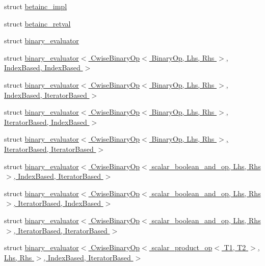 \begin{DoxyCompactItemize}
struct \hyperlink{struct_eigen_1_1internal_1_1betainc__impl}{betainc\+\_\+impl}
\item 
struct \hyperlink{struct_eigen_1_1internal_1_1betainc__retval}{betainc\+\_\+retval}
\item 
struct \hyperlink{struct_eigen_1_1internal_1_1binary__evaluator}{binary\+\_\+evaluator}
\item 
struct \hyperlink{struct_eigen_1_1internal_1_1binary__evaluator_3_01_cwise_binary_op_3_01_binary_op_00_01_lhs_00_009c1543c08828196fc8ade7d79a56c66}{binary\+\_\+evaluator$<$ Cwise\+Binary\+Op$<$ Binary\+Op, Lhs, Rhs $>$, Index\+Based, Index\+Based $>$}
\item 
struct \hyperlink{struct_eigen_1_1internal_1_1binary__evaluator_3_01_cwise_binary_op_3_01_binary_op_00_01_lhs_00_0e1df6e69b5cafbc50d80e8ad3bfd660e}{binary\+\_\+evaluator$<$ Cwise\+Binary\+Op$<$ Binary\+Op, Lhs, Rhs $>$, Index\+Based, Iterator\+Based $>$}
\item 
struct \hyperlink{struct_eigen_1_1internal_1_1binary__evaluator_3_01_cwise_binary_op_3_01_binary_op_00_01_lhs_00_0cb5b32f8780f5e04222972f8f6ae2d90}{binary\+\_\+evaluator$<$ Cwise\+Binary\+Op$<$ Binary\+Op, Lhs, Rhs $>$, Iterator\+Based, Index\+Based $>$}
\item 
struct \hyperlink{struct_eigen_1_1internal_1_1binary__evaluator_3_01_cwise_binary_op_3_01_binary_op_00_01_lhs_00_05c4f9212bd4fb2e2b8664dee5123f03b}{binary\+\_\+evaluator$<$ Cwise\+Binary\+Op$<$ Binary\+Op, Lhs, Rhs $>$, Iterator\+Based, Iterator\+Based $>$}
\item 
struct \hyperlink{struct_eigen_1_1internal_1_1binary__evaluator_3_01_cwise_binary_op_3_01scalar__boolean__and__op_e5783d1feefabf80ecedbbd659dac347}{binary\+\_\+evaluator$<$ Cwise\+Binary\+Op$<$ scalar\+\_\+boolean\+\_\+and\+\_\+op, Lhs, Rhs $>$, Index\+Based, Iterator\+Based $>$}
\item 
struct \hyperlink{struct_eigen_1_1internal_1_1binary__evaluator_3_01_cwise_binary_op_3_01scalar__boolean__and__op_e9805903bdca4d8b3e2f0d1430158176}{binary\+\_\+evaluator$<$ Cwise\+Binary\+Op$<$ scalar\+\_\+boolean\+\_\+and\+\_\+op, Lhs, Rhs $>$, Iterator\+Based, Index\+Based $>$}
\item 
struct \hyperlink{struct_eigen_1_1internal_1_1binary__evaluator_3_01_cwise_binary_op_3_01scalar__boolean__and__op_7d0a60161325a43ed07386a5222d16d5}{binary\+\_\+evaluator$<$ Cwise\+Binary\+Op$<$ scalar\+\_\+boolean\+\_\+and\+\_\+op, Lhs, Rhs $>$, Iterator\+Based, Iterator\+Based $>$}
\item 
struct \hyperlink{struct_eigen_1_1internal_1_1binary__evaluator_3_01_cwise_binary_op_3_01scalar__product__op_3_01_4fbec0bc40906a60ec0172ac23f5103a}{binary\+\_\+evaluator$<$ Cwise\+Binary\+Op$<$ scalar\+\_\+product\+\_\+op$<$ T1, T2 $>$, Lhs, Rhs $>$, Index\+Based, Iterator\+Based $>$}

\end{DoxyCompactItemize}
